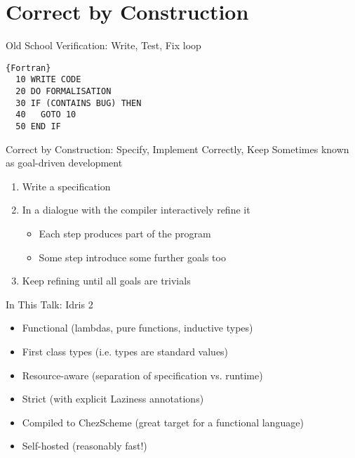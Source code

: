 \section{Correct by Construction}

\newcommand{\mathidris}[1]{{\bf{\mathtt{#1}}}}

\begin{frame}[fragile]{Old School Verification: Write, Test, Fix loop}
\begin{lstlisting}{Fortran}
  10 WRITE CODE
  20 DO FORMALISATION
  30 IF (CONTAINS BUG) THEN
  40   GOTO 10
  50 END IF
\end{lstlisting}
\end{frame}

\begin{frame}{Correct by Construction: Specify, Implement Correctly, Keep}
  Sometimes known as goal-driven development
  \vfill

  \begin{enumerate}
    \item Write a specification
    \item In a dialogue with the compiler interactively refine it
      \begin{itemize}
        \item Each step produces part of the program
        \item Some step introduce some further goals too
       \end{itemize}
    \item Keep refining until all goals are trivials
  \end{enumerate}
\end{frame}

\begin{frame}{In This Talk: Idris 2}
  \begin{itemize}
    \item<1-> Functional (lambdas, pure functions, inductive types)
    \item<2-> First class types (i.e. types are standard values)
    \item<3-> Resource-aware (separation of specification vs. runtime)
    \item<5-> Strict (with explicit Laziness annotations)
    \item<6-> Compiled to ChezScheme (great target for a functional language)
    \item<7-> Self-hosted (reasonably fast!)
  \end{itemize}


\end{frame}


